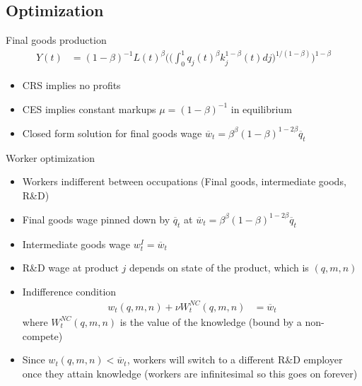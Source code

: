 \documentclass[english,usenames,dvipsnames]{beamer}
\begin{document}
\subsection{Optimization}
\begin{frame}{Final goods production}
	\begin{align*}
Y(t) &= (1-\beta)^{-1} L(t)^{\beta}\Bigg(\Big(\int_0^1 q_j(t)^\beta 
k_j^{1-\beta}(t)dj \Big)^{1/(1-\beta)}\Bigg)^{1-\beta}
\end{align*}
\begin{itemize}
	\item CRS implies no profits
	\item CES implies constant markups $\mu = (1-\beta)^{-1}$ in equilibrium
	\item Closed form solution for final goods wage  $\overline{w}_t = \beta^{\beta}(1-\beta)^{1-2\beta} \overline{q}_t$
\end{itemize}
\end{frame}

\begin{frame}{Worker optimization}
\small
\begin{itemize}
	\item Workers indifferent between occupations (Final goods, intermediate goods, R\&D)
	\item Final goods wage pinned down by $\overline{q}_t$ at $\overline{w}_t = \beta^{\beta}(1-\beta)^{1-2\beta} \overline{q}_t$
	\item Intermediate goods wage $w^I_t = \overline{w}_t$ 
	\item R\&D wage at product $j$ depends on state of the product, which is $(q,m,n)$
	\item Indifference condition
	\begin{align*}
	w_t(q,m,n) + \nu W^{NC}_t(q,m,n) &= \overline{w}_t
	\end{align*}
	where $W^{NC}_t(q,m,n)$ is the value of the knowledge (bound by a non-compete)
	\item Since $w_t(q,m,n) < \overline{w}_t$, workers will switch to a different R\&D employer once they attain knowledge (workers are infinitesimal so this goes on forever)
\end{itemize}
\end{frame}
\end{document}

